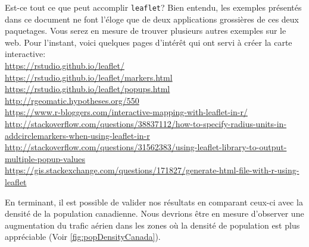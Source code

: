 \begin{moreInfo}{Est-ce tout ce que peut accomplir \texttt{leaflet}?}
	Bien entendu, les exemples présentés dans ce document ne font l'éloge que de deux applications grossières de ces deux paquetages. Vous serez en mesure de trouver plusieurs autres exemples sur le web. Pour l'instant, voici quelques pages d'intérêt qui ont servi à créer la carte interactive: \\
	\url{https://rstudio.github.io/leaflet/} \\
	\url{https://rstudio.github.io/leaflet/markers.html} \\
	\url{https://rstudio.github.io/leaflet/popups.html} \\
	\url{http://rgeomatic.hypotheses.org/550} \\
	\url{https://www.r-bloggers.com/interactive-mapping-with-leaflet-in-r/} \\
	\url{http://stackoverflow.com/questions/38837112/how-to-specify-radius-units-in-addcirclemarkers-when-using-leaflet-in-r} \\
	\url{http://stackoverflow.com/questions/31562383/using-leaflet-library-to-output-multiple-popup-values} \\
	\url{https://gis.stackexchange.com/questions/171827/generate-html-file-with-r-using-leaflet}
\end{moreInfo}

En terminant, il est possible de valider nos résultats en comparant ceux-ci avec la densité de la population canadienne. Nous devrions être en mesure d'observer une augmentation du trafic aérien dans les zones où la densité de population est plus appréciable (Voir \autoref{fig:popDensityCanada}). 

